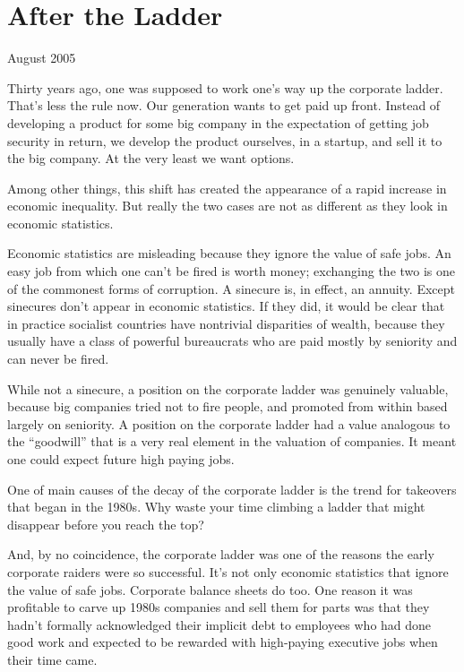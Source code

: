 \chapter{After the Ladder}

August 2005

Thirty years ago, one was supposed to work one's way up the corporate
ladder. That's less the rule now. Our generation wants to get paid up
front. Instead of developing a product for some big company in the
expectation of getting job security in return, we develop the product
ourselves, in a startup, and sell it to the big company. At the very
least we want options.

Among other things, this shift has created the appearance of a rapid
increase in economic inequality. But really the two cases are not as
different as they look in economic statistics.

Economic statistics are misleading because they ignore the value of safe
jobs. An easy job from which one can't be fired is worth money;
exchanging the two is one of the commonest forms of corruption. A
sinecure is, in effect, an annuity. Except sinecures don't appear in
economic statistics. If they did, it would be clear that in practice
socialist countries have nontrivial disparities of wealth, because they
usually have a class of powerful bureaucrats who are paid mostly by
seniority and can never be fired.

While not a sinecure, a position on the corporate ladder was genuinely
valuable, because big companies tried not to fire people, and promoted
from within based largely on seniority. A position on the corporate
ladder had a value analogous to the ``goodwill'' that is a very real
element in the valuation of companies. It meant one could expect future
high paying jobs.

One of main causes of the decay of the corporate ladder is the trend for
takeovers that began in the 1980s. Why waste your time climbing a ladder
that might disappear before you reach the top?

And, by no coincidence, the corporate ladder was one of the reasons the
early corporate raiders were so successful. It's not only economic
statistics that ignore the value of safe jobs. Corporate balance sheets
do too. One reason it was profitable to carve up 1980s companies and
sell them for parts was that they hadn't formally acknowledged their
implicit debt to employees who had done good work and expected to be
rewarded with high-paying executive jobs when their time came.

